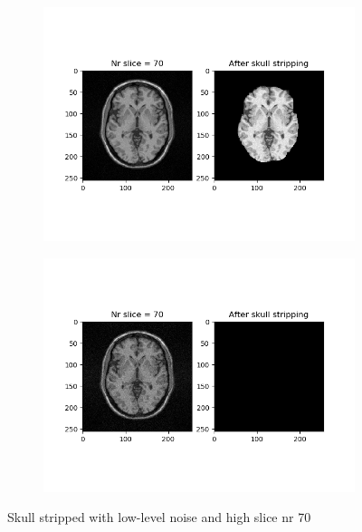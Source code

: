 \begin{figure}[H]
	\centering
	\begin{subfigure}[b]{0.35\linewidth}
		\includegraphics[scale=0.35]{figures/Module_08/M8_8.png}
	\end{subfigure}
		\begin{subfigure}[b]{0.35\linewidth}
		\includegraphics[scale=0.35]{figures/Module_08/M8_n8.png}
	\end{subfigure}
	\caption{Skull stripped with low-level noise and high slice nr 70}
	\label{fig:figures/m08_8}
\end{figure}

